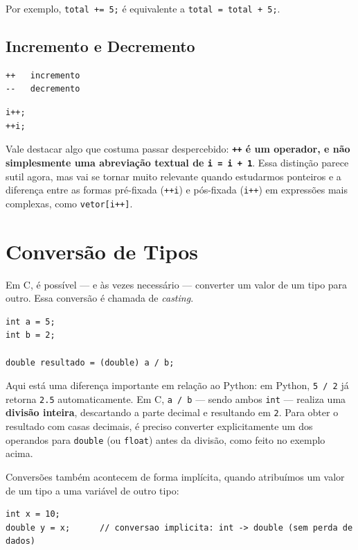 \documentclass[12pt,a4paper,oneside]{extreport}
\begin{document}
Por exemplo, \texttt{total += 5;} é equivalente a \texttt{total = total + 5;}.

\subsection{Incremento e Decremento}
\begin{lstlisting}
++   incremento
--   decremento
\end{lstlisting}

\begin{lstlisting}
i++;
++i;
\end{lstlisting}

Vale destacar algo que costuma passar despercebido: \textbf{\texttt{++} é um operador, e não simplesmente uma abreviação textual de \texttt{i = i + 1}}. Essa distinção parece sutil agora, mas vai se tornar muito relevante quando estudarmos ponteiros e a diferença entre as formas pré-fixada (\texttt{++i}) e pós-fixada (\texttt{i++}) em expressões mais complexas, como \texttt{vetor[i++]}.

\section{Conversão de Tipos}
Em C, é possível — e às vezes necessário — converter um valor de um tipo para outro. Essa conversão é chamada de \textit{casting}.

\begin{lstlisting}
int a = 5;
int b = 2;

double resultado = (double) a / b;
\end{lstlisting}

Aqui está uma diferença importante em relação ao Python: em Python, \texttt{5 / 2} já retorna \texttt{2.5} automaticamente. Em C, \texttt{a / b} — sendo ambos \texttt{int} — realiza uma \textbf{divisão inteira}, descartando a parte decimal e resultando em \texttt{2}. Para obter o resultado com casas decimais, é preciso converter explicitamente um dos operandos para \texttt{double} (ou \texttt{float}) antes da divisão, como feito no exemplo acima.

Conversões também acontecem de forma implícita, quando atribuímos um valor de um tipo a uma variável de outro tipo:

\begin{lstlisting}
int x = 10;
double y = x;      // conversao implicita: int -> double (sem perda de dados)
\end{lstlisting}
\end{document}
